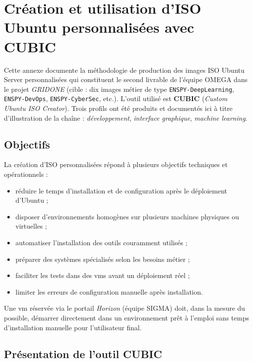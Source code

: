 \chapter{Création et utilisation d'ISO Ubuntu personnalisées avec CUBIC}
\label{annexe:iso}

Cette annexe documente la méthodologie de production des images ISO Ubuntu Server personnalisées qui constituent le second livrable de l'équipe OMEGA dans le projet \emph{GRIDONE} (cible : dix images métier de type \texttt{ENSPY-DeepLearning}, \texttt{ENSPY-DevOps}, \texttt{ENSPY-CyberSec}, etc.). L'outil utilisé est \textbf{CUBIC} (\emph{Custom Ubuntu ISO Creator}). Trois profils ont été produits et documentés ici à titre d'illustration de la chaîne : \emph{développement}, \emph{interface graphique}, \emph{machine learning}.

\section{Objectifs}

La création d'ISO personnalisées répond à plusieurs objectifs techniques et opérationnels :

\begin{itemize}[leftmargin=*]
    \item réduire le temps d'installation et de configuration après le déploiement d'Ubuntu ;
    \item disposer d'environnements homogènes sur plusieurs machines physiques ou virtuelles ;
    \item automatiser l'installation des outils couramment utilisés ;
    \item préparer des systèmes spécialisés selon les besoins métier ;
    \item faciliter les tests dans des \acrshort{vm}s avant un déploiement réel ;
    \item limiter les erreurs de configuration manuelle après installation.
\end{itemize}

Une \acrshort{vm} réservée via le portail \emph{Horizon} (équipe SIGMA) doit, dans la mesure du possible, démarrer directement dans un environnement prêt à l'emploi sans temps d'installation manuelle pour l'utilisateur final.

\section{Présentation de l'outil CUBIC}

